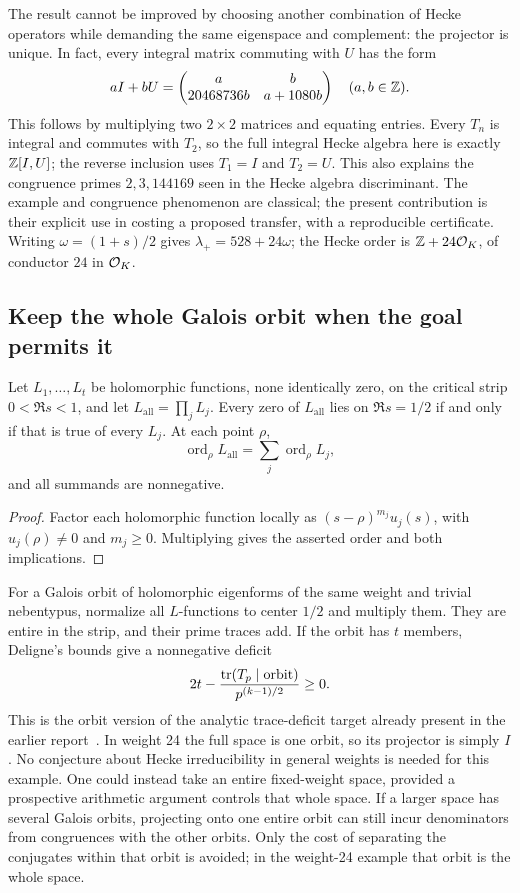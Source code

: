 The result cannot be improved by choosing another combination of Hecke
operators while demanding the same eigenspace and complement: the
projector is unique. In fact, every integral matrix commuting with $U$ has
the form
\[
 aI+bU=\begin{pmatrix}a&b\\20468736b&a+1080b\end{pmatrix}
 \quad(a,b\in\mathbb Z).
\]
This follows by multiplying two $2\times2$ matrices and equating entries.
Every $T_n$ is integral and commutes with $T_2$, so the full integral Hecke
algebra here is exactly $\mathbb Z[I,U]$; the reverse inclusion uses $T_1=I$ and
$T_2=U$. This also explains the congruence primes $2,3,144169$ seen in the
Hecke algebra discriminant. The example and congruence phenomenon are
classical; the present contribution is their explicit use in costing a
proposed transfer, with a reproducible certificate.
Writing $\omega=(1+s)/2$ gives $\lambda_+=528+24\omega$; the Hecke
order is $\mathbb Z+24\mathcal O_K$, of conductor $24$ in $\mathcal O_K$.

\subsection{Keep the whole Galois orbit when the goal permits it}

\begin{proposition}
Let $L_1,\ldots,L_t$ be holomorphic functions, none identically zero, on the critical
strip $0<\Re s<1$, and let $L_{\mathrm{all}}=\prod_j L_j$.
Every zero of $L_{\mathrm{all}}$ lies on $\Re s=1/2$ if and only if that
is true of every $L_j$. At each point $\rho$,
\[
 \operatorname{ord}_{\rho}L_{\mathrm{all}}
      =\sum_j\operatorname{ord}_{\rho}L_j,
\]
and all summands are nonnegative.
\end{proposition}
\begin{proof}
Factor each holomorphic function locally as
$(s-\rho)^{m_j}u_j(s)$, with $u_j(\rho)\ne0$ and $m_j\ge0$.
Multiplying gives the asserted order and both implications.
\end{proof}

For a Galois orbit of holomorphic eigenforms of the same weight and trivial
nebentypus, normalize all $L$-functions to center $1/2$ and multiply them.
They are entire in the strip, and their prime traces add. If the orbit has
$t$ members, Deligne's bounds give a nonnegative deficit
\[
 2t-\frac{\operatorname{tr}(T_p\mid\text{orbit})}{p^{(k-1)/2}}\ge0.
\]
This is the orbit version of the analytic trace-deficit target already
present in the earlier report~\cite{deficit,deligne}. In weight 24 the full
space is one orbit, so its projector is simply $I$. No conjecture about
Hecke irreducibility in general weights is needed for this example. One
could instead take an entire fixed-weight space, provided a prospective
arithmetic argument controls that whole space.
If a larger space has several Galois orbits, projecting onto one entire
orbit can still incur denominators from congruences with the other orbits.
Only the cost of separating the conjugates within that orbit is avoided;
in the weight-24 example that orbit is the whole space.

